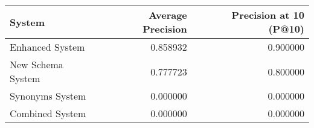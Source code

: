 \begin{tabular}{lrr}
\toprule
System & Average Precision & Precision at 10 (P@10) \\
\midrule
Enhanced System & 0.858932 & 0.900000 \\
New Schema System & 0.777723 & 0.800000 \\
Synonyms System & 0.000000 & 0.000000 \\
Combined System & 0.000000 & 0.000000 \\
\bottomrule
\end{tabular}
